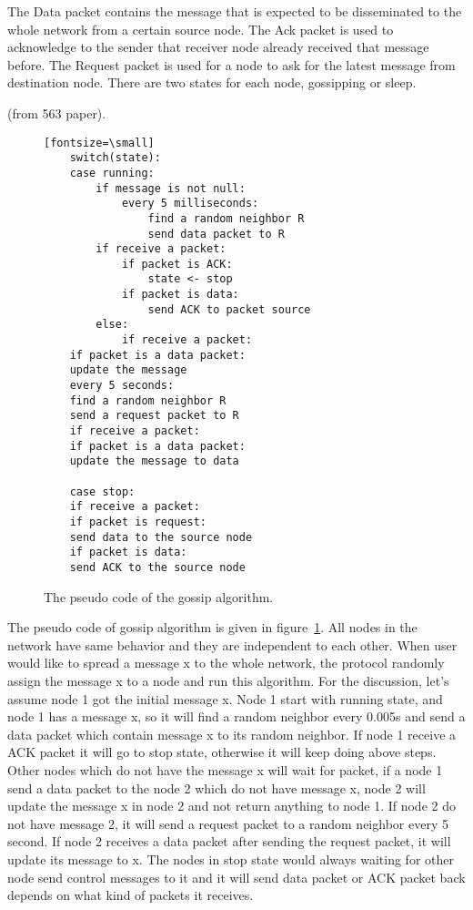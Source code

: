The Data packet contains the message that is expected to be disseminated to the whole network from a certain source node. The Ack packet is used to acknowledge to the sender that receiver node already received that message before. The Request packet is used for a node to ask for the latest message from destination node. There are two states for each node, gossipping or sleep.


(from 563 paper).

\begin{figure}
	\centering
	\begin{verbatim}[fontsize=\small]
	switch(state):
	case running:
		if message is not null:
			every 5 milliseconds:
				find a random neighbor R
				send data packet to R
		if receive a packet:
			if packet is ACK:
				state <- stop
			if packet is data:
				send ACK to packet source
		else:
			if receive a packet:
	if packet is a data packet:
	update the message
	every 5 seconds:
	find a random neighbor R
	send a request packet to R
	if receive a packet:
	if packet is a data packet:
	update the message to data
	
	case stop:
	if receive a packet:
	if packet is request:
	send data to the source node
	if packet is data:
	send ACK to the source node
	\end{verbatim}
	\caption{The pseudo code of the gossip algorithm.}
	\label{fig:pseudo}
\end{figure}

The pseudo code of gossip algorithm is given in figure~\ref{fig:pseudo}. All nodes in the network have same behavior and they are independent to each other. When user would like to spread a message x to the whole network, the protocol randomly assign the message x to a node and run this algorithm. For the discussion, let's assume node 1 got the initial message x. Node 1 start with running state, and node 1 has a message x, so it will find a random neighbor every 0.005s and send a data packet which contain message x to its random neighbor. If node 1 receive a ACK packet it will go to stop state, otherwise it will keep doing above steps. Other nodes which do not have the message x will wait for packet, if a node 1 send a data packet to the node 2 which do not have message x, node 2 will update the message x in node 2 and not return anything to node 1. If node 2 do not have message 2, it will send a request packet to a random neighbor every 5 second. If node 2 receives a data packet after sending the request packet, it will update its message to x. The nodes in stop state would always waiting for other node send control messages to it and it will send data packet or ACK packet back depends on what kind of packets it receives.
